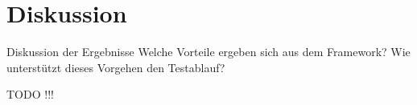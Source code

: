 ﻿\chapter{Diskussion}
\label{cha:Diskussion}

Diskussion der Ergebnisse
Welche Vorteile ergeben sich aus dem Framework?
Wie unterstützt dieses Vorgehen den Testablauf?

TODO !!!
